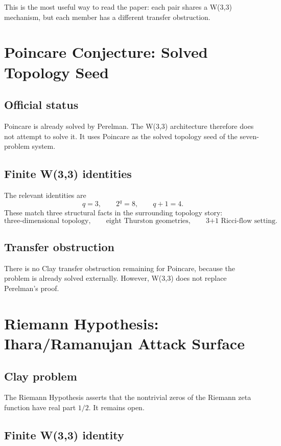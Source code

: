\documentclass[11pt]{article}
\theoremstyle{definition}
\begin{document}
This is the most useful way to read the paper: each pair shares a W(3,3) mechanism, but each member has a different transfer obstruction.

\section{Poincare Conjecture: Solved Topology Seed}

\subsection{Official status}

Poincare is already solved by Perelman.  The W(3,3) architecture therefore does not attempt to solve it.  It uses Poincare as the solved topology seed of the seven-problem system.

\subsection{Finite W(3,3) identities}

The relevant identities are
\[
  q=3,
  \qquad 2^q=8,
  \qquad q+1=4.
\]
These match three structural facts in the surrounding topology story:
\[
  \text{three-dimensional topology},
  \qquad \text{eight Thurston geometries},
  \qquad \text{3+1 Ricci-flow setting}.
\]

\subsection{Transfer obstruction}

There is no Clay transfer obstruction remaining for Poincare, because the problem is already solved externally.  However, W(3,3) does not replace Perelman's proof.

\section{Riemann Hypothesis: Ihara/Ramanujan Attack Surface}

\subsection{Clay problem}

The Riemann Hypothesis asserts that the nontrivial zeros of the Riemann zeta function have real part \(1/2\).  It remains open.

\subsection{Finite W(3,3) identity}
\end{document}
